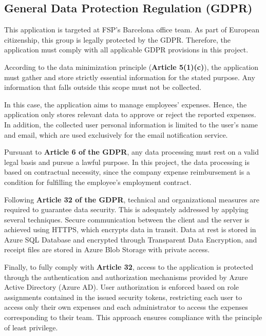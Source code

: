 \subsection{General Data Protection Regulation (GDPR)}
\label{regulatory-section}

This application is targeted at FSP's Barcelona office team. As part of European citizenship, this group is legally protected by the GDPR. Therefore, the application must comply with all applicable GDPR provisions in this project.

According to the data minimization principle (\textbf{Article 5(1)(c)}), the application must gather and store strictly essential information for the stated purpose. Any information that falls outside this scope must not be collected.

In this case, the application aims to manage employees' expenses. Hence, the application only stores relevant data to approve or reject the reported expenses. In addition, the collected user personal information is limited to the user's name and email, which are used exclusively for the email notification service. 


Pursuant to \textbf{Article 6 of the GDPR}, any data processing must rest on a valid legal basis and pursue a lawful purpose. In this project, the data processing is based on contractual necessity, since the company expense reimbursement is a condition for fulfilling the employee's employment contract.

Following \textbf{Article 32 of the GDPR}, technical and organizational measures are required to guarantee data security. This is adequately addressed by applying several techniques. Secure communication between the client and the server is achieved using HTTPS, which encrypts data in transit. Data at rest is stored in Azure SQL Database and encrypted through Transparent Data Encryption, and receipt files are stored in Azure Blob Storage with private access.

Finally, to fully comply with \textbf{Article 32}, access to the application is protected through the authentication and authorization mechanisms provided by Azure Active Directory (Azure AD). User authorization is enforced based on role assignments contained in the issued security tokens, restricting each user to access only their own expenses and each administrator to access the expenses corresponding to their team. This approach ensures compliance with the principle of least privilege.
